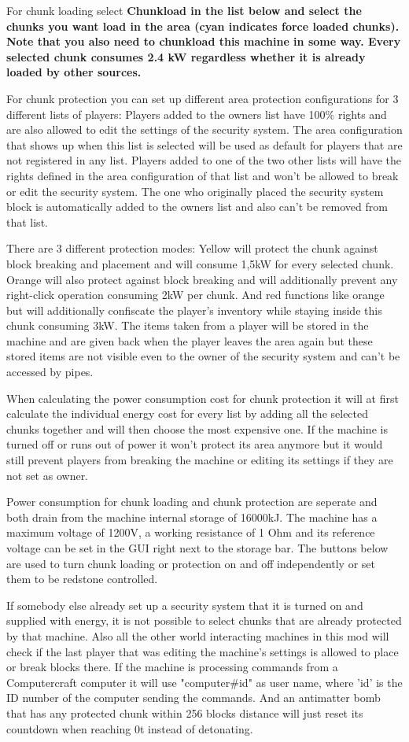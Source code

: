 \documentclass[11pt]{article} %
\begin{document}
For chunk loading select \bf Chunkload \rm in the list below and select the chunks you want load in the area (cyan indicates force loaded chunks). Note that you also need to chunkload this machine in some way. Every selected chunk consumes 2.4 kW regardless whether it is already loaded by other sources.

For chunk protection you can set up different area protection configurations for 3 different lists of players: Players added to the owners list have 100\% rights and are also allowed to edit the settings of the security system. The area configuration that shows up when this list is selected will be used as default for players that are not registered in any list. Players added to one of the two other lists will have the rights defined in the area configuration of that list and won't be allowed to break or edit the security system. The one who originally placed the security system block is automatically added to the owners list and also can't be removed from that list.

There are 3 different protection modes: Yellow will protect the chunk against block breaking and placement and will consume 1,5kW for every selected chunk. Orange will also protect against block breaking and will additionally prevent any right-click operation consuming 2kW per chunk. And red functions like orange but will additionally confiscate the player's inventory while staying inside this chunk consuming 3kW. The items taken from a player will be stored in the machine and are given back when the player leaves the area again but these stored items are not visible even to the owner of the security system and can't be accessed by pipes.

When calculating the power consumption cost for chunk protection it will at first calculate the individual energy cost for every list by adding all the selected chunks together and will then choose the most expensive one. If the machine is turned off or runs out of power it won't protect its area anymore but it would still prevent players from breaking the machine or editing its settings if they are not set as owner. 

Power consumption for chunk loading and chunk protection are seperate and both drain from the machine internal storage of 16000kJ. The machine has a maximum voltage of 1200V, a working resistance of 1 Ohm and its reference voltage can be set in the GUI right next to the storage bar. The buttons below are used to turn chunk loading or protection on and off independently or set them to be redstone controlled.

If somebody else already set up a security system that it is turned on and supplied with energy, it is not possible to select chunks that are already protected by that machine. Also all the other world interacting machines in this mod will check if the last player that was editing the machine's settings is allowed to place or break blocks there. If the machine is processing commands from a Computercraft computer it will use "computer\#id" as user name, where 'id' is the ID number of the computer sending the commands. And an antimatter bomb that has any protected chunk within 256 blocks distance will just reset its countdown when reaching 0t instead of detonating.
\end{document}
